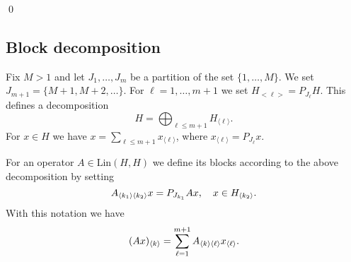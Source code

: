 \qed


\subsection{Block decomposition}
\label{subsec:lmgssblk-decmp}
Fix $M>1$ and let $J_1,\dots,J_m$ be a partition of the set $\{1,\dots,M\}$. We set $J_{m+1}=\{M+1,M+2,\dots\}$.
For $\ell=1,\dots,m+1$ we set $H_{<\ell>}=P_{J_\ell}H$. This defines a decomposition
\begin{equation}
 H=\bigoplus_{\ell \leq m+1} H_{\langle \ell \rangle}.   \label{eq:H-decmp}
 \end{equation}
For $x \in H$ we have $x=\sum_{\ell \leq m+1} x_{\langle \ell \rangle}$, where $x_{\langle \ell \rangle}=P_{J_{\ell}}x$.

For an operator $A \in \mbox{Lin}(H,H)$ we define its blocks according to the above decomposition by setting
\begin{equation*}
  A_{\langle k_1 \rangle \langle k_2 \rangle} x= P_{J_{k_1}}Ax, \quad x\in H_{\langle k_2\rangle}.
\end{equation*}
With this notation we have
\begin{equation*}
   (A x)_{\langle k \rangle} = \sum_{\ell=1}^{m+1} A_{\langle k \rangle \langle \ell \rangle} x_{\langle \ell \rangle}.
\end{equation*}





